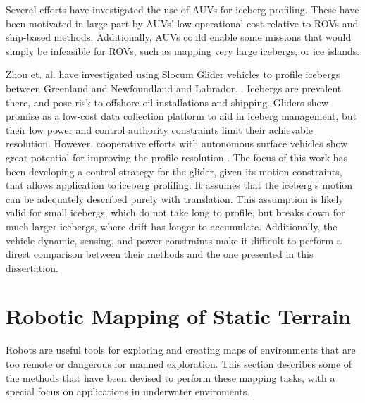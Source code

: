 Several efforts have investigated the use of AUVs for iceberg profiling. These have been motivated in large part by AUVs' low operational cost relative to ROVs and ship-based methods. Additionally, AUVs could enable some missions that would simply be infeasible for ROVs, such as mapping very large icebergs, or ice islands. 

Zhou et. al. have investigated using Slocum Glider vehicles to profile icebergs between Greenland and Newfoundland and Labrador. \cite{Zhou2014}. Icebergs are prevalent there, and pose risk to offshore oil installations and shipping. Gliders show promise as a low-cost data collection platform to aid in iceberg management, but their low power and control authority constraints limit their achievable resolution. However, cooperative efforts with autonomous surface vehicles show great potential for improving the profile resolution \cite{Smith2014}. The focus of this work has been developing a control strategy for the glider, given its motion constraints, that allows application to iceberg profiling. It assumes that the iceberg's motion can be adequately described purely with translation. This assumption is likely valid for small icebergs, which do not take long to profile, but breaks down for much larger icebergs, where drift has longer to accumulate. Additionally, the vehicle dynamic, sensing, and power constraints make it difficult to perform a direct comparison between their methods and the one presented in this dissertation. 




\section{Robotic Mapping of Static Terrain}

Robots are useful tools for exploring and creating maps of environments that are too remote or dangerous for manned exploration. This section describes some of the methods that have been devised to perform these mapping tasks, with a special focus on applications in underwater enviroments.

